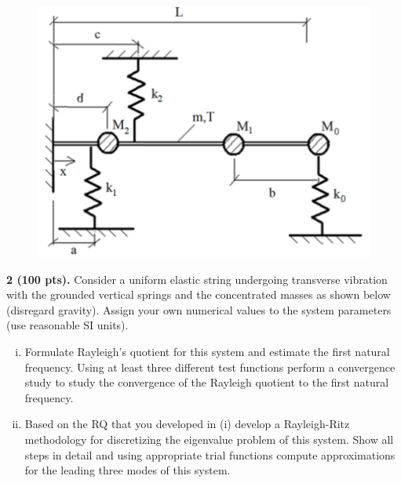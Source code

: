 \newpage
\begin{problem}
    \begin{figure}
        \vspace{0.75cm}
        \centering
        \includegraphics[width=0.95\linewidth]{homework/hw3/assets/hw3_p2.png}
    \end{figure}
    \textbf{2 (100 pts).} Consider a uniform elastic string undergoing transverse vibration with the grounded vertical springs and the concentrated masses as shown below (disregard gravity). 
    Assign your own numerical values to the system parameters (use reasonable SI units).
    \begin{enumerate}[(i)]
    \item {
        Formulate Rayleigh's quotient for this system and estimate the first natural frequency. 
        Using at least three different test functions perform a convergence study to study the convergence of the Rayleigh quotient to the first natural frequency.
    }
    \item {
        Based on the RQ that you developed in (i) develop a Rayleigh-Ritz methodology for discretizing the eigenvalue problem of this system. 
        Show all steps in detail and using appropriate trial functions compute approximations for the leading three modes of this system.
    }
    \end{enumerate}
\end{problem}

